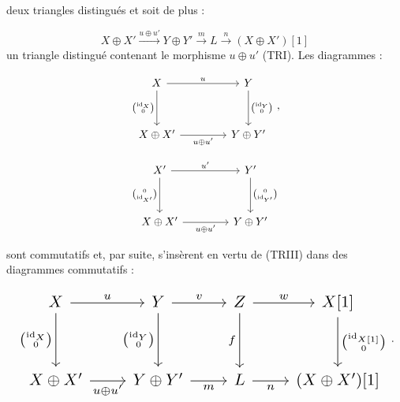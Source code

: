\clearpage
{}%
\begingroup
\small
\setlength{\abovedisplayskip}{4pt plus 2pt minus 2pt}%
\setlength{\belowdisplayskip}{4pt plus 2pt minus 2pt}%

deux triangles distingués et soit de plus :

\[
  X\oplus X'\xrightarrow{u\oplus u'}Y\oplus Y'
  \xrightarrow{m}L\xrightarrow{n}(X\oplus X')[1]
\]
un triangle distingué contenant le morphisme $u\oplus u'$ (TRI). Les
diagrammes :

\begin{equation*}
  \begin{tikzcd}[column sep=4.2em,row sep=3.2em]
    X \arrow[r,"u"] \arrow[d,"{\binom{\operatorname{id}_X}{0}}"']
      & Y \arrow[d,"{\binom{\operatorname{id}_Y}{0}}"] \\
    X\oplus X' \arrow[r,"{u\oplus u'}"']
      & Y\oplus Y'
  \end{tikzcd}
  \,,
\end{equation*}

\begin{equation*}
  \begin{tikzcd}[column sep=4.2em,row sep=3.2em]
    X' \arrow[r,"{u'}"] \arrow[d,"{\binom{0}{\operatorname{id}_{X'}}}"']
      & Y' \arrow[d,"{\binom{0}{\operatorname{id}_{Y'}}}"] \\
    X\oplus X' \arrow[r,"{u\oplus u'}"']
      & Y\oplus Y'
  \end{tikzcd}
\end{equation*}

sont commutatifs et, par suite, s'insèrent en vertu de (TRIII) dans des
diagrammes commutatifs :

\begin{equation*}
  \resizebox{0.98\linewidth}{!}{%
    $\begin{tikzcd}[ampersand replacement=\&,column sep=2.25em,row sep=3.1em]
      X \arrow[r,"u"] \arrow[d,"{\binom{\operatorname{id}_X}{0}}"']
        \& Y \arrow[r,"v"] \arrow[d,"{\binom{\operatorname{id}_Y}{0}}"']
        \& Z \arrow[r,"w"] \arrow[d,"f"']
        \& X[1] \arrow[d,"{\binom{\operatorname{id}_{X[1]}}{0}}"] \\
      X\oplus X' \arrow[r,"{u\oplus u'}"']
        \& Y\oplus Y' \arrow[r,"m"']
        \& L \arrow[r,"n"']
        \& (X\oplus X')[1]
    \end{tikzcd}$%
  }\,.
\end{equation*}

